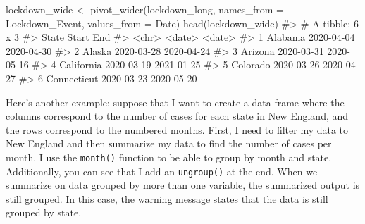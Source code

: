 \documentclass[
  letterpaper,
]{latex/krantz}
\makeatletter
\newenvironment{Shaded}{\begin{snugshade}}{\end{snugshade}}
\newcommand{\AttributeTok}[1]{\textcolor[rgb]{0.40,0.45,0.13}{#1}}
\newcommand{\CommentTok}[1]{\textcolor[rgb]{0.37,0.37,0.37}{#1}}
\newcommand{\FunctionTok}[1]{\textcolor[rgb]{0.28,0.35,0.67}{#1}}
\newcommand{\NormalTok}[1]{\textcolor[rgb]{0.00,0.23,0.31}{#1}}
\newcommand{\OtherTok}[1]{\textcolor[rgb]{0.00,0.23,0.31}{#1}}
\newenvironment{kframe}{%
\medskip{}
\setlength{\fboxsep}{.8em}
 \def\at@end@of@kframe{}%
 \ifinner\ifhmode%
  \def\at@end@of@kframe{\end{minipage}}%
  \begin{minipage}{\columnwidth}%
 \fi\fi%
 \def\FrameCommand##1{\hskip\@totalleftmargin \hskip-\fboxsep
 \colorbox{shadecolor}{##1}\hskip-\fboxsep
     \hskip-\linewidth \hskip-\@totalleftmargin \hskip\columnwidth}%
 \MakeFramed {\advance\hsize-\width
   \@totalleftmargin\z@ \linewidth\hsize
   \@setminipage}}%
 {\par\unskip\endMakeFramed%
 \at@end@of@kframe}
\renewenvironment{Shaded}{\begin{kframe}}{\end{kframe}}
\makeatother
\begin{document}
\begin{Shaded}
\begin{Highlighting}[]
\NormalTok{lockdown\_wide }\OtherTok{\textless{}{-}} \FunctionTok{pivot\_wider}\NormalTok{(lockdown\_long, }
                             \AttributeTok{names\_from =}\NormalTok{ Lockdown\_Event, }
                             \AttributeTok{values\_from =}\NormalTok{ Date)}
\FunctionTok{head}\NormalTok{(lockdown\_wide)}
\CommentTok{\#\textgreater{} \# A tibble: 6 x 3}
\CommentTok{\#\textgreater{}   State       Start      End       }
\CommentTok{\#\textgreater{}   \textless{}chr\textgreater{}       \textless{}date\textgreater{}     \textless{}date\textgreater{}    }
\CommentTok{\#\textgreater{} 1 Alabama     2020{-}04{-}04 2020{-}04{-}30}
\CommentTok{\#\textgreater{} 2 Alaska      2020{-}03{-}28 2020{-}04{-}24}
\CommentTok{\#\textgreater{} 3 Arizona     2020{-}03{-}31 2020{-}05{-}16}
\CommentTok{\#\textgreater{} 4 California  2020{-}03{-}19 2021{-}01{-}25}
\CommentTok{\#\textgreater{} 5 Colorado    2020{-}03{-}26 2020{-}04{-}27}
\CommentTok{\#\textgreater{} 6 Connecticut 2020{-}03{-}23 2020{-}05{-}20}
\end{Highlighting}
\end{Shaded}

Here's another example: suppose that I want to create a data frame where
the columns correspond to the number of cases for each state in New
England, and the rows correspond to the numbered months. First, I need
to filter my data to New England and then summarize my data to find the
number of cases per month. I use the
\texttt{month()} function to
be able to group by month and state. Additionally, you can see that I
add an \texttt{ungroup()} at the end. When we summarize on data grouped
by more than one variable, the summarized output is still grouped. In
this case, the warning message states that the data is still grouped by
state.
\end{document}
